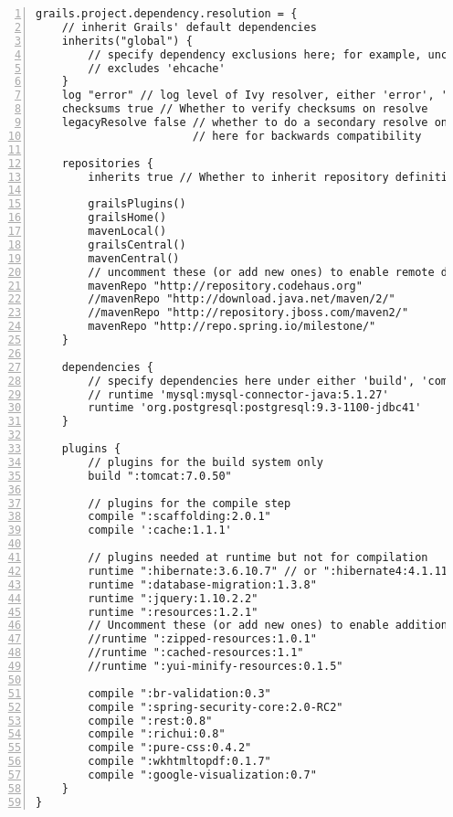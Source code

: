 \begin{lstlisting}[numbers=left,  caption={\bf  BuildConfig.groovy}, frame=trBL,
    float=htbp, label=codBuildConfig4]
grails.project.dependency.resolution = {
    // inherit Grails' default dependencies
    inherits("global") {
        // specify dependency exclusions here; for example, uncomment this to disable ehcache:
        // excludes 'ehcache'
    }
    log "error" // log level of Ivy resolver, either 'error', 'warn', 'info', 'debug' or 'verbose'
    checksums true // Whether to verify checksums on resolve
    legacyResolve false // whether to do a secondary resolve on plugin installation, not advised and 
                        // here for backwards compatibility

    repositories {
        inherits true // Whether to inherit repository definitions from plugins

        grailsPlugins()
        grailsHome()
        mavenLocal()
        grailsCentral()
        mavenCentral()
        // uncomment these (or add new ones) to enable remote dependency resolution from public Maven repositories
        mavenRepo "http://repository.codehaus.org"
        //mavenRepo "http://download.java.net/maven/2/"
        //mavenRepo "http://repository.jboss.com/maven2/"
        mavenRepo "http://repo.spring.io/milestone/"
    }

    dependencies {
        // specify dependencies here under either 'build', 'compile', 'runtime', 'test' or 'provided' scopes e.g.
        // runtime 'mysql:mysql-connector-java:5.1.27'
        runtime 'org.postgresql:postgresql:9.3-1100-jdbc41'
    }

    plugins {
        // plugins for the build system only
        build ":tomcat:7.0.50"

        // plugins for the compile step
        compile ":scaffolding:2.0.1"
        compile ':cache:1.1.1'

        // plugins needed at runtime but not for compilation
        runtime ":hibernate:3.6.10.7" // or ":hibernate4:4.1.11.6"
        runtime ":database-migration:1.3.8"
        runtime ":jquery:1.10.2.2"
        runtime ":resources:1.2.1"
        // Uncomment these (or add new ones) to enable additional resources capabilities
        //runtime ":zipped-resources:1.0.1"
        //runtime ":cached-resources:1.1"
        //runtime ":yui-minify-resources:0.1.5"
        
        compile ":br-validation:0.3"
        compile ":spring-security-core:2.0-RC2"
        compile ":rest:0.8"
        compile ":richui:0.8"
        compile ":pure-css:0.4.2"
        compile ":wkhtmltopdf:0.1.7"
        compile ":google-visualization:0.7"
    }
}
\end{lstlisting}

